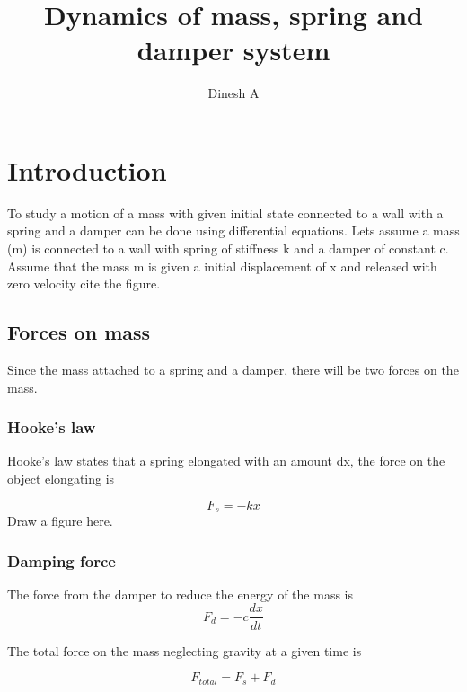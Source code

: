 \documentclass{article}
\begin{document}
\title{Dynamics of mass, spring and damper system}
\author{Dinesh A}

\maketitle
\section{Introduction}
To study a motion of a mass with given initial state connected to a
wall with a spring and a damper can be done using differential
equations. Lets assume a mass (m) is connected to a wall with spring
of stiffness k and a damper of constant c. Assume that the mass m is
given a initial displacement of x and released with zero velocity
{cite the figure}. 

\subsection{Forces on mass}
Since the mass attached to a spring and a damper, there will be two forces 
on the mass.

\subsubsection{Hooke's law}

Hooke's law  states that  a spring  elongated with  an amount  dx, the
force on the object elongating is

\begin{equation}
  F_s = -kx
\end{equation}
Draw a figure here.

\subsubsection{Damping force}

The force from the damper to reduce the energy of
the mass is 
\begin{equation}
  F_d = -c\frac{dx}{dt}
\end{equation}

The total force on the mass neglecting gravity at a given time is

\begin{equation}
  F_{total} = F_s + F_d
\end{equation}
\end{document}

